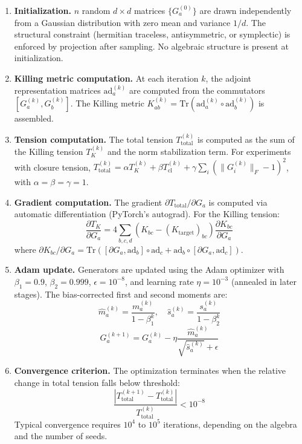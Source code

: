 \begin{enumerate}[label=\arabic*.]
\item \textbf{Initialization.} $n$ random $d \times d$ matrices $\{G_a^{(0)}\}$ are drawn independently from a Gaussian distribution with zero mean and variance $1/d$. The structural constraint (hermitian traceless, antisymmetric, or symplectic) is enforced by projection after sampling. No algebraic structure is present at initialization.

\item \textbf{Killing metric computation.} At each iteration $k$, the adjoint representation matrices $\mathrm{ad}_a^{(k)}$ are computed from the commutators $[G_a^{(k)}, G_b^{(k)}]$. The Killing metric $K_{ab}^{(k)} = \mathrm{Tr}(\mathrm{ad}_a^{(k)} \circ \mathrm{ad}_b^{(k)})$ is assembled.

\item \textbf{Tension computation.} The total tension $T_{\mathrm{total}}^{(k)}$ is computed as the sum of the Killing tension $T_K^{(k)}$ and the norm stabilization term. For experiments with closure tension, $T_{\mathrm{total}}^{(k)} = \alpha T_K^{(k)} + \beta T_{\mathrm{cl}}^{(k)} + \gamma \sum_i (\|G_i^{(k)}\|_F - 1)^2$, with $\alpha = \beta = \gamma = 1$.

\item \textbf{Gradient computation.} The gradient $\partial T_{\mathrm{total}} / \partial G_a$ is computed via automatic differentiation (PyTorch's autograd). For the Killing tension:
\begin{equation}
\frac{\partial T_K}{\partial G_a} = 4 \sum_{b,c,d} \left(K_{bc} - (K_{\mathrm{target}})_{bc}\right) \frac{\partial K_{bc}}{\partial G_a}
\end{equation}
where $\partial K_{bc} / \partial G_a = \mathrm{Tr}([\partial G_a, \mathrm{ad}_b] \circ \mathrm{ad}_c + \mathrm{ad}_b \circ [\partial G_a, \mathrm{ad}_c])$.

\item \textbf{Adam update.} Generators are updated using the Adam optimizer with $\beta_1 = 0.9$, $\beta_2 = 0.999$, $\epsilon = 10^{-8}$, and learning rate $\eta = 10^{-3}$ (annealed in later stages). The bias-corrected first and second moments are:
\begin{equation}
\hat{m}_a^{(k)} = \frac{m_a^{(k)}}{1 - \beta_1^k}, \quad \hat{s}_a^{(k)} = \frac{s_a^{(k)}}{1 - \beta_2^k}
\end{equation}
\begin{equation}
G_a^{(k+1)} = G_a^{(k)} - \eta \frac{\hat{m}_a^{(k)}}{\sqrt{\hat{s}_a^{(k)}} + \epsilon}
\end{equation}

\item \textbf{Convergence criterion.} The optimization terminates when the relative change in total tension falls below threshold:
\begin{equation}
\frac{|T_{\mathrm{total}}^{(k+1)} - T_{\mathrm{total}}^{(k)}|}{T_{\mathrm{total}}^{(k)}} < 10^{-8}
\end{equation}
Typical convergence requires $10^4$ to $10^5$ iterations, depending on the algebra and the number of seeds.
\end{enumerate}

